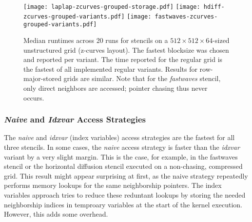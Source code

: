 \begin{figure}
	\texttt{[image: laplap-zcurves-grouped-storage.pdf]} %
	\texttt{[image: hdiff-zcurves-grouped-variants.pdf]} %
	\texttt{[image: fastwaves-zcurves-grouped-variants.pdf]} %
	\caption{\label{fig:storage-access} Median runtimes across 20 runs for stencils on a $512\times512\times 64$-sized unstructured grid (z-curves layout). The fastest blocksize was chosen and reported per variant. The time reported for the regular grid is the fastest of all implemented regular variants. Results for row-major-stored grids are similar. Note that for the \emph{fastwaves} stencil, only direct neighbors are accessed; pointer chasing thus never occurs.}
\end{figure}

\subsubsection{\emph{Naive} and \emph{Idxvar} Access Strategies}
The \emph{naive} and \emph{idxvar} (index variables) access strategies are the fastest for all three stencils. In some cases, the \emph{naive} access strategy is faster than the \emph{idxvar} variant by a very slight margin. This is the case, for example, in the fastwaves stencil or the horizontal diffusion stencil executed on a non-chasing, compressed grid. This result might appear surprising at first, as the naive strategy repeatedly performs memory lookups for the same neighborship pointers. The index variables approach tries to reduce these reduntant lookups by storing the needed neighborship indices in temproary variables at the start of the kernel execution. However, this adds some overhead.


